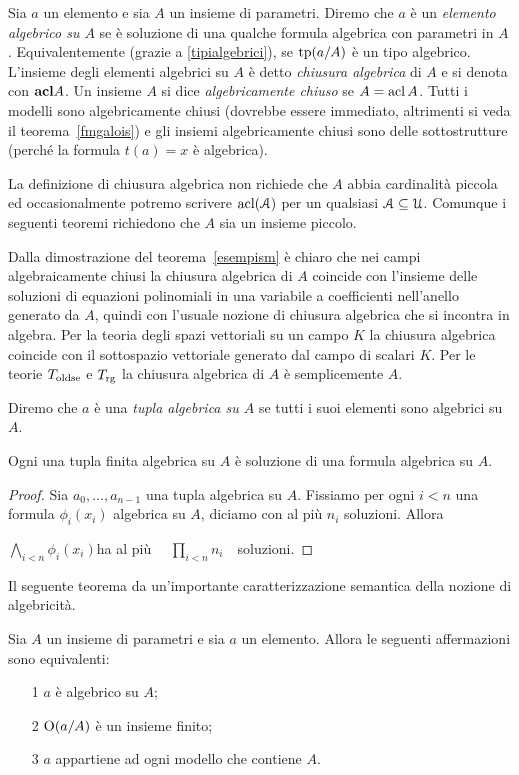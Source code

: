 Sia $a$ un elemento e sia $A$ un insieme di parametri. Diremo che $a$ \`e un \emph{elemento algebrico su $A$\/} se \`e soluzione di una qualche formula algebrica con parametri in $A$. Equivalentemente (grazie a \ref{tipialgebrici}), se $\textrm{tp}(a/A)$ \`e un tipo algebrico. L'insieme degli elementi algebrici su $A$ \`e detto \emph{chiusura algebrica\/} di $A$ e si denota con \emph{${\rm\bf acl} A$}. Un insieme $A$ si dice \emph{algebricamente chiuso\/} se $A=\mathop{\rm acl} A$. Tutti i modelli sono algebricamente chiusi (dovrebbe essere immediato, altrimenti si veda il teorema~\ref{fmgalois}) e gli insiemi algebricamente chiusi sono delle sottostrutture (perch\'e la formula $t(a)=x$ \`e algebrica).

La definizione di chiusura algebrica non richiede che $A$ abbia cardinalit\`a piccola ed occasionalmente potremo scrivere $\mathop{\rm acl}(\EuScript A)$ per un qualsiasi $\EuScript A\subseteq\EuScript U$. Comunque i seguenti teoremi richiedono che $A$ sia un insieme piccolo.

Dalla dimostrazione del teorema~\ref{esempism} \`e chiaro che nei campi algebraicamente chiusi la chiusura algebrica di $A$ coincide con l'insieme delle soluzioni di equazioni polinomiali in una variabile a coefficienti nell'anello generato da $A$, quindi con l'usuale nozione di chiusura algebrica che si incontra in algebra. Per la teoria degli spazi vettoriali su un campo $K$ la chiusura algebrica coincide con il sottospazio vettoriale generato dal campo di scalari $K$. Per le teorie $T_{\rm oldse}$ e $T_{\rm rg}$ la chiusura algebrica di $A$ \`e semplicemente $A$.

Diremo che $a$ \`e una \emph{tupla algebrica su $A$\/} se tutti i suoi elementi sono algebrici su $A$.

\begin{lemma}
Ogni una tupla finita algebrica su $A$ \`e soluzione di una formula algebrica su $A$.
\end{lemma}
\begin{proof}
Sia $a_0,\dots,a_{n-1}$ una tupla algebrica su $A$. Fissiamo per ogni $i<n$ una formula $\phi_i(x_i)$ algebrica su $A$, diciamo con al pi\`u $n_i$ soluzioni. Allora

\hfill $\displaystyle\bigwedge_{i<n}\phi_i(x_i)$\hfill ha al pi\`u \ \  $\displaystyle\prod_{i<n}n_i$\ \ soluzioni.
\end{proof}

Il seguente teorema da un'importante caratterizzazione semantica della nozione di algebricit\`a.

\begin{theorem}\label{fmgalois}
Sia $A$ un insieme di parametri e sia $a$ un elemento. Allora le seguenti affermazioni sono equivalenti:
\begin{itemize}
\item[1] $a$ \`e algebrico su $A$;
\item[2] $\textrm{O}(a/A)$ \`e un insieme finito;
\item[3] $a$ appartiene ad ogni modello che contiene $A$.
\end{itemize}
\end{theorem}

